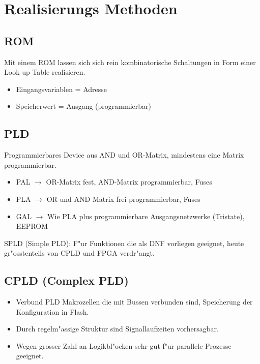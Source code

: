 \section{Realisierungs Methoden}
\subsection{ROM}
Mit einem ROM lassen sich sich rein kombinatorische Schaltungen in Form einer Look up Table realisieren.
\begin{itemize}
	\setlength{\itemsep}{1pt}
  \setlength{\parskip}{0pt}
  \setlength{\parsep}{0pt}
  
	\item Eingangsvariablen = Adresse
	\item Speicherwert = Ausgang (programmierbar)
\end{itemize}



\subsection{PLD}
Programmierbares Device aus AND und OR-Matrix, mindestens eine Matrix programmierbar.
\begin{itemize}
	\setlength{\itemsep}{1pt}
  \setlength{\parskip}{0pt}
  \setlength{\parsep}{0pt}
  
	\item PAL $\rightarrow$ OR-Matrix fest, AND-Matrix programmierbar, Fuses
	\item PLA $\rightarrow$ OR und AND Matrix frei programmierbar, Fuses
	\item GAL $\rightarrow$ Wie PLA plus programmierbare Ausgangsnetzwerke (Tristate), EEPROM
\end{itemize}
SPLD (Simple PLD): F"ur Funktionen die als DNF vorliegen geeignet, heute gr"osstenteils von CPLD und FPGA verdr"angt.

\subsection{CPLD (Complex PLD)}
\begin{itemize}
	\setlength{\itemsep}{1pt}
  \setlength{\parskip}{0pt}
  \setlength{\parsep}{0pt}
  
	\item Verbund PLD Makrozellen die mit Bussen verbunden sind, Speicherung der Konfiguration in Flash.
	\item	Durch regelm"assige Struktur sind Signallaufzeiten vorhersagbar.
	\item Wegen grosser Zahl an Logikbl"ocken sehr gut f"ur parallele Prozesse geeignet.
\end{itemize}

